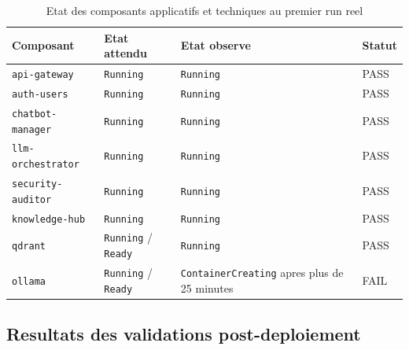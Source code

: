 \begin{table}[h]
\centering
\begin{tabular}{|p{4.1cm}|p{2.4cm}|p{4.8cm}|p{2.8cm}|}
\hline
\textbf{Composant} & \textbf{Etat attendu} & \textbf{Etat observe} & \textbf{Statut} \\
\hline
\texttt{api-gateway} & \texttt{Running} & \texttt{Running} & PASS \\
\hline
\texttt{auth-users} & \texttt{Running} & \texttt{Running} & PASS \\
\hline
\texttt{chatbot-manager} & \texttt{Running} & \texttt{Running} & PASS \\
\hline
\texttt{llm-orchestrator} & \texttt{Running} & \texttt{Running} & PASS \\
\hline
\texttt{security-auditor} & \texttt{Running} & \texttt{Running} & PASS \\
\hline
\texttt{knowledge-hub} & \texttt{Running} & \texttt{Running} & PASS \\
\hline
\texttt{qdrant} & \texttt{Running} / \texttt{Ready} & \texttt{Running} & PASS \\
\hline
\texttt{ollama} & \texttt{Running} / \texttt{Ready} & \texttt{ContainerCreating} apres plus de 25 minutes & FAIL \\
\hline
\end{tabular}
\caption{Etat des composants applicatifs et techniques au premier run reel}
\end{table}

\subsection{Resultats des validations post-deploiement}

